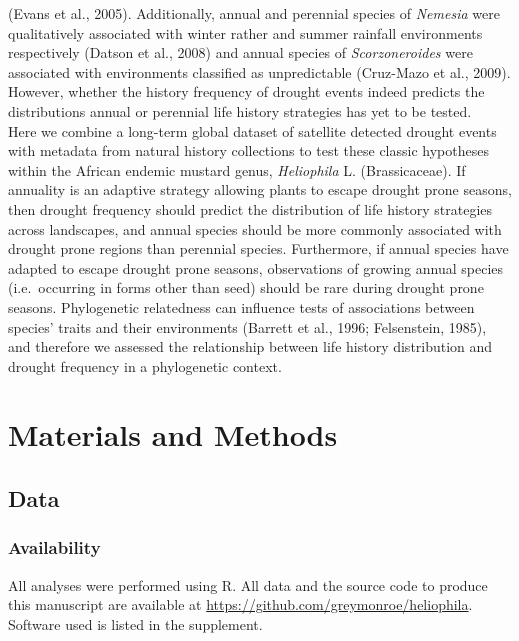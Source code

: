 \documentclass[man,floatsintext]{apa6}
\theoremstyle{definition}
\theoremstyle{definition}
\theoremstyle{definition}
\theoremstyle{remark}
\begin{document}
(Evans et al., 2005). Additionally, annual and perennial species of
\emph{Nemesia} were qualitatively associated with winter rather and
summer rainfall environments respectively (Datson et al., 2008) and
annual species of \emph{Scorzoneroides} were associated with
environments classified as unpredictable (Cruz-Mazo et al., 2009).
However, whether the history frequency of drought events indeed predicts
the distributions annual or perennial life history strategies has yet to
be tested.\\
Here we combine a long-term global dataset of satellite detected drought
events with metadata from natural history collections to test these
classic hypotheses within the African endemic mustard genus,
\emph{Heliophila} L. (Brassicaceae). If annuality is an adaptive
strategy allowing plants to escape drought prone seasons, then drought
frequency should predict the distribution of life history strategies
across landscapes, and annual species should be more commonly associated
with drought prone regions than perennial species. Furthermore, if
annual species have adapted to escape drought prone seasons,
observations of growing annual species (i.e.~occurring in forms other
than seed) should be rare during drought prone seasons. Phylogenetic
relatedness can influence tests of associations between species' traits
and their environments (Barrett et al., 1996; Felsenstein, 1985), and
therefore we assessed the relationship between life history distribution
and drought frequency in a phylogenetic context.

\hypertarget{materials-and-methods}{%
\section{Materials and Methods}\label{materials-and-methods}}

\hypertarget{data}{%
\subsection{Data}\label{data}}

\hypertarget{availability}{%
\subsubsection{Availability}\label{availability}}

All analyses were performed using R. All data and the source code to
produce this manuscript are available at
\url{https://github.com/greymonroe/heliophila}. Software used is listed
in the supplement.
\end{document}
